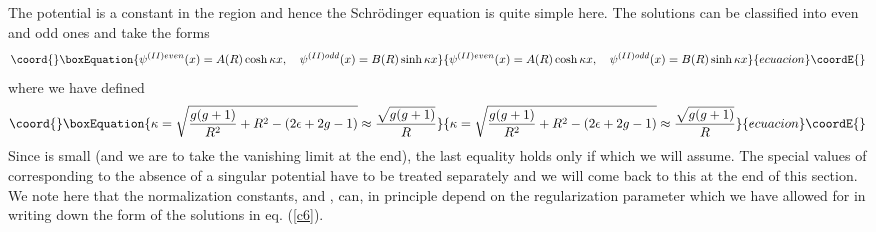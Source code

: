 \documentclass[a4paper,11pt]{article}
\begin{document}
The potential is a constant in the region \coordHE{} and hence the
Schr\"{o}dinger equation is quite simple here. The solutions can be
classified into even and odd ones and take the forms
\begin{equation}\coord{}\boxEquation{
\psi^{(II)even}(x) = A(R) \cosh \kappa x,\quad
\psi^{(II)odd}(x)  = B(R) \sinh \kappa x\label{c6}
}{
\psi^{(II)even}(x) = A(R) \cosh \kappa x,\quad
\psi^{(II)odd}(x)  = B(R) \sinh \kappa x}{ecuacion}\coordE{}\end{equation}
where we have defined
\begin{equation}\coord{}\boxEquation{
\kappa = \sqrt{{g(g+1)\over R^{2}}+R^{2}-(2\epsilon + 2g - 1)}\approx
{\sqrt{g(g+1)}\over R}\label{c7}
}{
\kappa = \sqrt{{g(g+1)\over R^{2}}+R^{2}-(2\epsilon + 2g - 1)}\approx
{\sqrt{g(g+1)}\over R}}{ecuacion}\coordE{}\end{equation}
Since \coordHE{} is small (and we are to take the vanishing limit at the
end), the last equality holds only if \coordHE{} which we will
assume. The special values of \coordHE{} corresponding to the absence of a
singular potential have to be treated separately and we will come back
to this at the end of this section. We note here that the
normalization constants, \coordHE{} and \coordHE{}, can, in principle depend on the
regularization parameter which we have allowed for in writing down the
form of the solutions in eq. (\ref{c6}).
\end{document}
